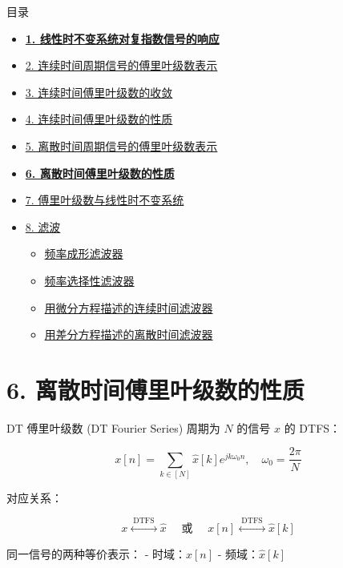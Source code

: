 \documentclass[
  ignorenonframetext,
]{beamer}
\providecommand{\tightlist}{%
  \setlength{\itemsep}{0pt}\setlength{\parskip}{0pt}}
\begin{document}
\begin{frame}{目录}
\protect{}\label{toc5}
\begin{itemize}
\tightlist
\item
  \hyperlink{sec31}{\textbf{1. 线性时不变系统对复指数信号的响应}}
\item
  \hyperlink{sec32}{2. 连续时间周期信号的傅里叶级数表示}
\item
  \hyperlink{sec33}{3. 连续时间傅里叶级数的收敛}
\item
  \hyperlink{sec34}{4. 连续时间傅里叶级数的性质}
\item
  \hyperlink{35}{5. 离散时间周期信号的傅里叶级数表示}
\item
  \hyperlink{sec36}{\textbf{6. 离散时间傅里叶级数的性质}}
\item
  \hyperlink{sec37}{7. 傅里叶级数与线性时不变系统}
\item
  \hyperlink{sec38}{8. 滤波}

  \begin{itemize}
  \tightlist
  \item
    \hyperlink{sec381}{频率成形滤波器}
  \item
    \hyperlink{sec382}{频率选择性滤波器}
  \item
    \hyperlink{sec383}{用微分方程描述的连续时间滤波器}
  \item
    \hyperlink{sec383}{用差分方程描述的离散时间滤波器}
  \end{itemize}
\end{itemize}
\end{frame}

\section{6. 离散时间傅里叶级数的性质}\label{sec36}

\begin{frame}{DT 傅里叶级数 (DT Fourier Series)}
\protect{}\label{dt-ux5085ux91ccux53f6ux7ea7ux6570-dt-fourier-series}
周期为 \(N\) 的信号 \(x\) 的 DTFS：

\[
x[n]=\sum_{k \in[N]} \hat{x}[k] e^{j k \omega_{0} n}, \quad \omega_{0}=\frac{2 \pi}{N}
\]

对应关系：

\[
x \stackrel{\text { DTFS }}{\longleftrightarrow} \hat{x} \quad \text { 或 } \quad x[n] \stackrel{\text { DTFS }}{\longleftrightarrow} \hat{x}[k]
\]

同一信号的两种等价表示： - 时域：\(x[n]\) - 频域：\(\hat{x}[k]\)
\end{frame}
\end{document}

